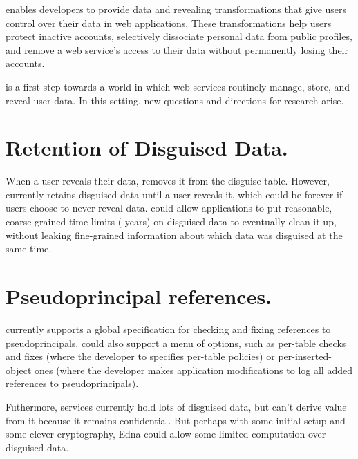 %
\sys enables developers to provide data \xxing and revealing
transformations that give users control over their data in web applications.
%
These transformations help users protect inactive accounts, selectively dissociate
personal data from public profiles, and remove a web service's access to their
data without permanently losing their accounts.
%


\sys is a first step towards a world in which web services
routinely manage, store, and reveal \xxed user data.
%
In this setting, new questions and directions for research arise.
%

\section{Retention of Disguised Data.}
%
When a user reveals their data, \sys removes it from the disguise table.
%
However, \sys currently retains disguised data until a user reveals it, which
could be forever if users choose to never reveal data.
%
\sys could allow applications to put reasonable,
coarse-grained time limits ( years) on disguised data to eventually clean
it up, without leaking fine-grained information about which data was disguised
at the same time.


\section{Pseudoprincipal references.}
%
\sys currently supports a global specification for checking and fixing references to
pseudoprincipals.
%
\sys could also support a menu of options, such
as per-table checks and fixes (where the developer to specifies per-table
policies) or per-inserted-object ones (where the developer makes application
modifications to log all added references to pseudoprincipals).




Futhermore, services currently hold lots of disguised data, but can’t derive value from it because it remains confidential. But perhaps with some initial setup and some clever cryptography, Edna could allow some limited computation over disguised data.


